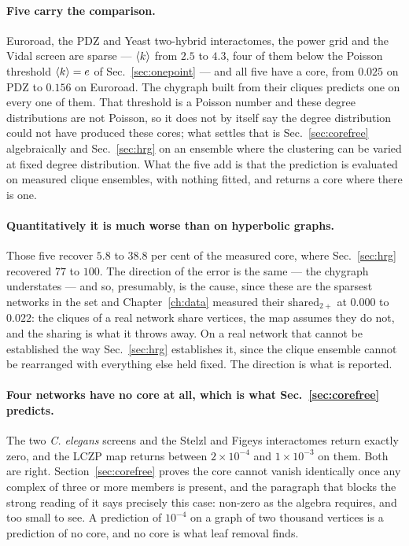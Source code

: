 \paragraph{Five carry the comparison.} Euroroad, the PDZ and Yeast two-hybrid
interactomes, the power grid and the Vidal screen are sparse --- $\langle k \rangle$ from
$2.5$ to $4.3$, four of them below the Poisson threshold $\langle k \rangle=e$ of
Sec.~\ref{sec:onepoint} --- and all five have a core, from $0.025$ on PDZ to
$0.156$ on Euroroad. The chygraph built from their cliques predicts one on
every one of them. That threshold is a Poisson number and these degree
distributions are not Poisson, so it does not by itself say the degree
distribution could not have produced these cores; what settles that is
Sec.~\ref{sec:corefree} algebraically and Sec.~\ref{sec:hrg} on an ensemble
where the clustering can be varied at fixed degree distribution. What the five
add is that the prediction is evaluated on measured clique ensembles, with
nothing fitted, and returns a core where there is one.

\paragraph{Quantitatively it is much worse than on hyperbolic graphs.} Those
five recover $5.8$ to $38.8$ per cent of the measured core, where
Sec.~\ref{sec:hrg} recovered $77$ to $100$. The direction of the error is the
same --- the chygraph understates --- and so, presumably, is the cause, since
these are the sparsest networks in the set and Chapter~\ref{ch:data} measured
their $\mathrm{shared}_{2+}$ at $0.000$ to $0.022$: the cliques of a real
network share vertices, the map assumes they do not, and the sharing is what it
throws away. On a real network that cannot be established the way
Sec.~\ref{sec:hrg} establishes it, since the clique ensemble cannot be
rearranged with everything else held fixed. The direction is what is reported.

\paragraph{Four networks have no core at all, which is what
Sec.~\ref{sec:corefree} predicts.} The two \emph{C. elegans} screens and the
Stelzl and Figeys interactomes return exactly zero, and the LCZP map
returns between $2\times10^{-4}$ and $1\times10^{-3}$ on them. Both are right.
Section~\ref{sec:corefree} proves the core cannot vanish identically once any
complex of three or more members is present, and the paragraph that blocks the
strong reading of it says precisely this case: non-zero as the algebra requires,
and too small to see. A prediction of $10^{-4}$ on a graph of two thousand
vertices is a prediction of no core, and no core is what leaf removal finds.

